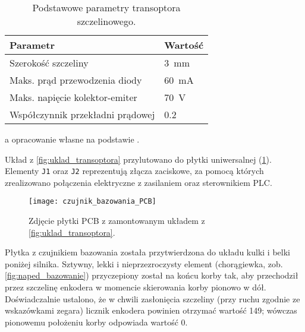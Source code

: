\begin{table}[h]
    \centering
    \begin{threeparttable}
        \caption{Podstawowe parametry transoptora szczelinowego.}
        \label{tab:parametry_transoptora}
        
        \begin{tabularx}{0.6\textwidth}{l | l}
            \toprule
            Parametr & Wartość \\
            \midrule
            Szerokość szczeliny & \SI{3}{\milli\meter} \\
            Maks. prąd przewodzenia diody & \SI{60}{\milli\ampere} \\
            Maks. napięcie kolektor-emiter & \SI{70}{\volt} \\
            Współczynnik przekładni prądowej & \num{0,2} \\
            \bottomrule
        \end{tabularx}
        
        \begin{tablenotes}
            \footnotesize
            \item[a] opracowanie własne na podstawie \cite{TRANSOPTOR_MANUAL}.
        \end{tablenotes}
    \end{threeparttable}
\end{table}

Układ z \cref{fig:uklad_transoptora} przylutowano do płytki uniwersalnej (\cref{fig:czujnik_bazowania_PCB}). Elementy \texttt{J1} oraz \texttt{J2} reprezentują złącza zaciskowe, za pomocą których zrealizowano połączenia elektryczne z zasilaniem oraz sterownikiem PLC.

\begin{figure}[h]
    \centering
    \texttt{[image: czujnik\_bazowania\_PCB]}
    \caption{Zdjęcie płytki PCB z zamontowanym układem z \cref{fig:uklad_transoptora}.}
    \label{fig:czujnik_bazowania_PCB}
\end{figure}

Płytka z czujnikiem bazowania została przytwierdzona do układu kulki i belki poniżej silnika. Sztywny, lekki i nieprzezroczysty element (chorągiewka, zob. \cref{fig:naped_bazowanie}) przyczepiony został na końcu korby tak, aby przechodził przez szczelinę enkodera w momencie skierowania korby pionowo w dół. Doświadczalnie ustalono, że w chwili zasłonięcia szczeliny (przy ruchu zgodnie ze wskazówkami zegara) licznik enkodera powinien otrzymać wartość \num{149}; wówczas pionowemu położeniu korby odpowiada wartość \num{0}.

